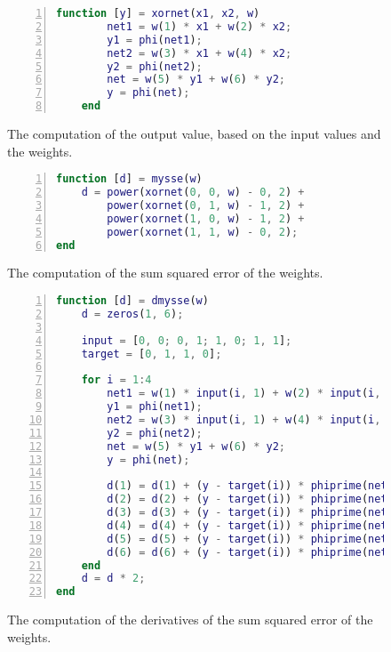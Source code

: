 \documentclass{article}
\begin{document}
\begin{figure}[h]
	\begin{lstlisting}[language=matlab, numbers=left, tabsize=4, frame=single, basicstyle=\footnotesize]
	function [y] = xornet(x1, x2, w)
		net1 = w(1) * x1 + w(2) * x2;
	 	y1 = phi(net1);
		net2 = w(3) * x1 + w(4) * x2;
	 	y2 = phi(net2);
		net = w(5) * y1 + w(6) * y2;
	 	y = phi(net);
	end
	\end{lstlisting}
	\caption{The computation of the output value, based on the input values and the weights.}
\end{figure}

\begin{figure}
	\begin{lstlisting}[language=matlab, numbers=left, tabsize=4, frame=single, basicstyle=\footnotesize, breaklines=true]
function [d] = mysse(w)
	d = power(xornet(0, 0, w) - 0, 2) + 
		power(xornet(0, 1, w) - 1, 2) + 
		power(xornet(1, 0, w) - 1, 2) + 
		power(xornet(1, 1, w) - 0, 2);
end
	\end{lstlisting}
	\caption{The computation of the sum squared error of the weights.}
\end{figure}


\begin{figure}
	\begin{lstlisting}[language=matlab, numbers=left, tabsize=4, frame=single, basicstyle=\footnotesize, breaklines=true, deletekeywords={input}]
function [d] = dmysse(w)
	d = zeros(1, 6);

	input = [0, 0; 0, 1; 1, 0; 1, 1];
	target = [0, 1, 1, 0];

	for i = 1:4
		net1 = w(1) * input(i, 1) + w(2) * input(i, 2);
		y1 = phi(net1);
		net2 = w(3) * input(i, 1) + w(4) * input(i, 2);
		y2 = phi(net2);
		net = w(5) * y1 + w(6) * y2; 
		y = phi(net);
	
		d(1) = d(1) + (y - target(i)) * phiprime(net) * w(5) * phiprime(net1) * input(i, 1);
		d(2) = d(2) + (y - target(i)) * phiprime(net) * w(5) * phiprime(net1) * input(i, 2);
		d(3) = d(3) + (y - target(i)) * phiprime(net) * w(6) * phiprime(net2) * input(i, 1);
		d(4) = d(4) + (y - target(i)) * phiprime(net) * w(6) * phiprime(net2) * input(i, 2);
		d(5) = d(5) + (y - target(i)) * phiprime(net) * y1;
		d(6) = d(6) + (y - target(i)) * phiprime(net) * y2;
	end
	d = d * 2;
end
	\end{lstlisting}
	\caption{The computation of the derivatives of the sum squared error of the weights.}
\end{figure}
\end{document}
